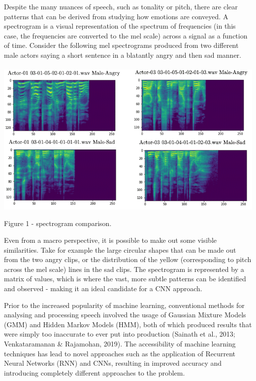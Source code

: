 \documentclass[12pt]{article}
\begin{document}
\noindent Despite the many nuances of speech, such as tonality or pitch, there are clear patterns that can be derived from studying how emotions are conveyed. A spectrogram is a visual representation of the spectrum of frequencies (in this case, the frequencies are converted to the mel scale) across a signal as a function of time. Consider the following mel spectrograms produced from two different male actors saying a short sentence in a blatantly angry and then sad manner.
\\
\\
\includegraphics[width=14cm]{figure_1_spectrogram_comparison}

\noindent Figure 1 - spectrogram comparison.
\vspace{0.05cm}

\noindent Even from a macro perspective, it is possible to make out some visible similarities. Take for example the large circular shapes that can be made out from the two angry clips, or the distribution of the yellow (corresponding to pitch across the mel scale) lines in the sad clips. The spectrogram is represented by a matrix of values, which is where the vast, more subtle patterns can be identified and observed - making it an ideal candidate for a CNN approach.

\newpage

\noindent Prior to the increased popularity of machine learning, conventional methods for analysing and processing speech involved the usage of Gaussian Mixture Models (GMM) and Hidden Markov Models (HMM), both of which produced results that were simply too inaccurate to ever put into production (Sainath et al., 2013; Venkataramanan \& Rajamohan, 2019). The accessibility of machine learning techniques has lead to novel approaches such as the application of Recurrent Neural Networks (RNN) and CNNs, resulting in improved accuracy and introducing completely different approaches to the problem.
\\
\end{document}
